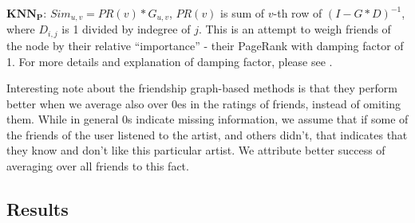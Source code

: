 \documentclass{article} %
\begin{document}
$\bm{KNN_P}$: $Sim_{u,v} = PR(v) * G_{u,v}$, $PR(v)$ is sum of
  $v$-th row of $(I - G * D)^{-1}$, where $D_{i,j}$ is 1 divided by indegree of
  $j$. This is an attempt to weigh friends of the node by their relative
  ``importance'' - their PageRank with damping factor of 1.
  For more details and explanation of damping factor, please see
  \cite{page1999pagerank}.


Interesting note about the friendship graph-based methods is that they perform
better when we average also over 0es in the ratings of friends, instead of
omiting them. While in general 0s indicate missing information, we assume that
if some of the friends of the user listened to the artist, and others didn't,
that indicates that they know and don't like this particular artist. We
attribute better success of averaging over all friends to this fact.


\subsection{Results}
\end{document}

